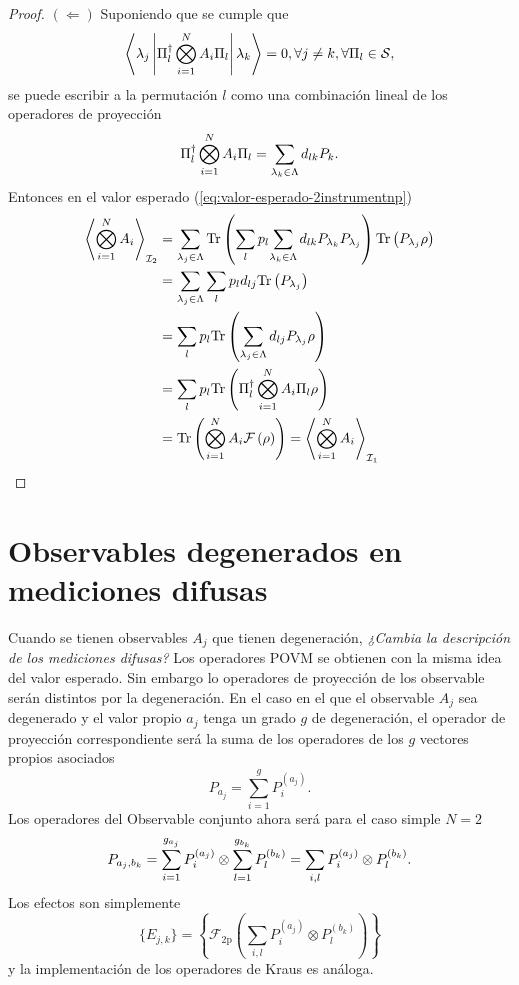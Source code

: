 \documentclass[12pt,oneside]{book}\raggedbottom{}
\begin{document}
\begin{proof}
$(\Leftarrow)$ Suponiendo que se cumple que \[ \left\langle\lambda_j\left|\Pi_{l}^{\dagger}\bigotimes_{i=1}^{N} A_i\Pi_{l}\right|\lambda_k\right\rangle=0, \forall j\neq k, \forall \Pi_l \in \mathcal{S},\] se puede  escribir a la permutación $l$ como una combinación lineal de los operadores de proyección\[\Pi_{l}^{\dagger}\bigotimes_{i=1}^{N} A_i\Pi_{l}=\sum_{\lambda_k \in \Lambda}d_{lk}P_{k}.\]Entonces en el valor esperado ({\ref{eq:valor-esperado-2instrumentnp}})
 \[\begin{split}\left \langle \bigotimes_{i=1}^{N} A_i \right \rangle_{\mathcal{I}_2}&=\sum_{\lambda_j\in \Lambda} {\rm Tr}\left(\sum_{l}p_l{\sum_{\lambda_k \in \Lambda}d_{lk}P_{\lambda_k}}P_{\lambda_j}\right) {\rm Tr}\left(P_{\lambda_j}\rho\right)\\ &=\sum_{\lambda_j\in \Lambda} \sum_{l}p_l d_{lj}{\rm Tr}\left(P_{\lambda_j}\right)\\ &=\sum_{l}p_l {\rm Tr}\left( \sum_{\lambda_j\in \Lambda} d_{lj}P_{\lambda_j}\rho\right)\\ &=\sum_{l}p_l{\rm Tr}\left(\Pi_{l}^{\dagger}\bigotimes_{i=1}^{N} A_i\Pi_{l}\rho\right)\\ 
    &={\rm Tr}\left(\bigotimes_{i=1}^{N} A_i\mathcal{F}\left(\rho\right)\right)=\left \langle \bigotimes_{i=1}^{N} A_i \right \rangle_{\mathcal{I}_1}
\end{split}\]

\end{proof}

\section*{Observables degenerados en mediciones difusas}

Cuando se tienen observables $A_j$ que tienen degeneración, \textit{¿Cambia la descripción de los mediciones difusas?} Los operadores POVM se obtienen con la misma idea del valor esperado. Sin embargo lo operadores de proyección de los observable serán distintos por la degeneración. En el caso en el que el observable $A_j$ sea degenerado y el valor propio $a_j$ tenga un grado $g$ de degeneración, el operador de proyección correspondiente será la suma de los operadores de los $g$ vectores propios asociados\[P_{a_j}=\sum_{i=1}^{g} {P}_{i}^{(a_j)}.\] Los operadores del Observable conjunto ahora será para el caso simple $N=2$ \[P_{a_j,b_k}=\sum_{i=1}^{g_{a_j}} {P}_{i}^{(a_j)}\otimes \sum_{l=1}^{g_{b_k}} {P}_{l}^{(b_k)}=\sum_{i,l} {P}_{i}^{(a_j)}\otimes P_{l}^{(b_k)}.\]Los efectos son simplemente \[\{E_{j,k}\}=\left\{\mathcal{F}_{2\text{p}}\left(\sum_{i,l} {P}_{i}^{(a_j)}\otimes P_{l}^{(b_k)}\right)\right\}\] y la implementación de los operadores de Kraus es análoga. 
\end{document}
